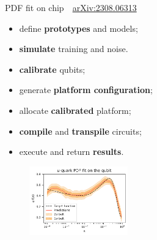 \documentclass[aspectratio=169, 8pt, xcolor={svgnames}, hyperref={linkcolor=black}]{beamer}
\begin{document}
\begin{frame}{PDF fit on chip \hfill \faBook\,\, \href{https://arxiv.org/abs/2308.06313}{arXiv:2308.06313}}

\begin{multicols}{2}
\hspace{2cm}
\begin{tcolorbox}[title=High level API: Qibo, colback=blue!20]
\begin{itemize}[noitemsep]
\small
   \item[\faCode] define \textbf{prototypes} and models;
   \item[\faCode] \textbf{simulate} training and noise.
\end{itemize}
\end{tcolorbox}
\begin{tcolorbox}[title=Calibration: Qibocal, colback=yellow!20]
\begin{itemize}[noitemsep]
\small
   \item[\faCrosshairs] \textbf{calibrate} qubits;
   \item[\faCrosshairs] generate \textbf{platform configuration};
\end{itemize}
\end{tcolorbox}
\begin{tcolorbox}[title=Execution: Qibolab, colback=red!20]
\begin{itemize}[noitemsep]
\small
   \item[\faCog] allocate \textbf{calibrated} platform;
   \item[\faCog] \textbf{compile} and \textbf{transpile} circuits;
   \item[\faCog] execute and return \textbf{results}.
\end{itemize}
\end{tcolorbox}
\pause
\begin{figure}  
    \includegraphics[width=0.38\textwidth]{figures/qpdf.pdf}
\end{figure}
\begin{center}
\begin{table}
\vspace{-0.5cm}

\end{table}
\end{center}
\end{multicols}
\end{frame}
\end{document}
